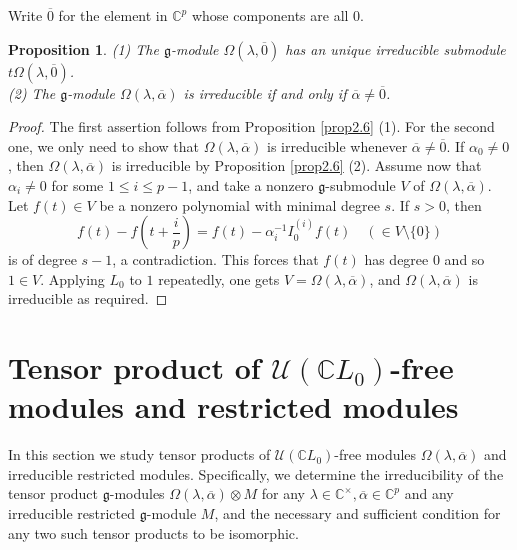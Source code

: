 \documentclass[12pt, reqno]{amsart}
\numberwithin{equation}{section}
\newtheorem{proposition}[theorem]{Proposition}%
\numberwithin{equation}{section}
\def\lmd{\lambda}
\def\al{\alpha}
\def\g{\mathfrak{g}}
\def\({\left(}
\def\){\right)}
\def\U{\mathcal{U}}
\newcommand{\C}{\mathbb C}
\newcommand{\ov}[1]{\overline{#1}}
\newcommand{\elei}[2]{I_{#1}^{(#2)}}
\begin{document}
Write $\ov 0$ for the element in $\C^p$ whose components are all $0$.

\begin{proposition}\label{prop3.1}
 (1) The $\g$-module $\Omega(\lmd,\ov0)$ has an unique irreducible submodule $t\Omega(\lmd,\ov0)$.\\
 (2) The $\g$-module $\Omega(\lmd,\ov\al)$ is irreducible if and only if $\ov\al\neq\ov0$.
\end{proposition}
\begin{proof}
 The first assertion follows from Proposition \ref{prop2.6} (1).
 For the second one, we only need to show that $\Omega(\lmd,\ov\al)$ is irreducible whenever  $\ov\al\neq\ov0$. If $\al_0\neq 0$, then $\Omega(\lmd,\ov\al)$ is irreducible by Proposition \ref{prop2.6} (2). Assume now that  $\al_i\ne 0$ for some $1\le i\le p-1$,
 and take a nonzero $\g$-submodule $V$ of $\Omega(\lmd,\ov\al)$.
 Let $f(t)\in V$ be a nonzero polynomial with minimal degree $s$. If $s>0$, then
 $$f(t)-f\(t+\frac ip\)=f(t)-\al_i^{-1}\elei 0if(t)\quad \(\in V\setminus\{0\}\)$$
 is of degree $s-1$, a contradiction. This forces that $f(t)$ has degree $0$ and so $1\in V$.
 Applying $L_0$ to $1$ repeatedly, one gets $V=\Omega(\lmd,\ov\al)$, and $\Omega(\lmd,\ov\al)$ is irreducible as required.
\end{proof}

\section{Tensor product of $\U(\C L_0)$-free modules and restricted modules}

In this section we study tensor products of $\U(\C L_0)$-free modules $\Omega(\lmd,\ov\al)$ and irreducible restricted modules.
Specifically, we determine the irreducibility of the tensor product $\g$-modules $\Omega(\lmd,\ov\al)\otimes M$
for any $\lmd\in\C^\times, \ov\al\in\C^p$ and any irreducible restricted $\g$-module $M$,
and the necessary and sufficient condition for any two such tensor products to be isomorphic.
\end{document}
